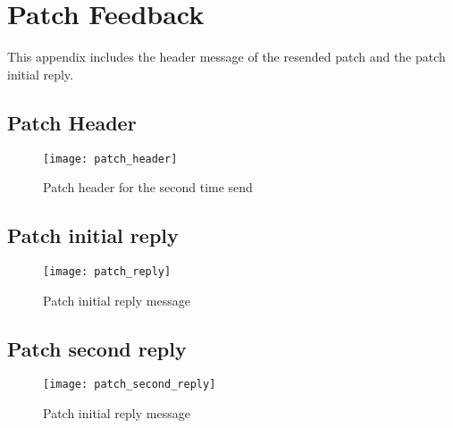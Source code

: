 \chapter{Patch Feedback}

\label{app:feedback}

This appendix includes the header message of the resended patch and the 
patch initial reply.

\section{Patch Header} 

\begin{figure}
\texttt{[image: patch\_header]}
\caption{Patch header for the second time send}
\label{fig:patch_header}
\end{figure}

\newpage

\section{Patch initial reply}

\begin{figure}
\texttt{[image: patch\_reply]}
\caption{Patch initial reply message}
\label{fig:patch_reply}
\end{figure}

\newpage

\section{Patch second reply}

\begin{figure}
\texttt{[image: patch\_second\_reply]}
\caption{Patch initial reply message}
\label{fig:patch_second_reply}
\end{figure}
